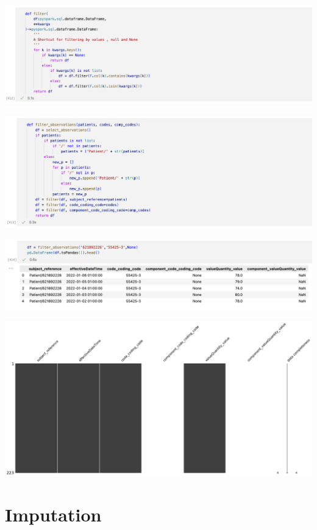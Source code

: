 \documentclass[11pt, oneside]{article}
\begin{document}
\begin{center}
\includegraphics[scale=0.4]{2_filter.png}
\end{center}
\begin{center}
\includegraphics[scale=0.4]{2_filter_obs.png}
\end{center}
\begin{center}
\includegraphics[scale=0.4]{2_filter_obs_df.png}
\end{center}
\begin{center}
\includegraphics[scale=0.4]{2_msn_df.png}
\end{center}

\section{Imputation}
\end{document}
